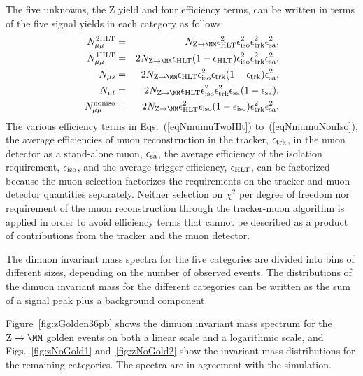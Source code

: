 The five unknowns, the Z yield and four efficiency terms, can be written in terms of
the five signal yields in each category as follows:
\begin{eqnarray}
 \label{eqNmumuTwoHlt}
   \NmumuTwoHlt & = & \NZtomumu \effHlt^2 \effIso^2 \effTrk^2 \effSa^2,  \\
  \label{eqNmumuOneHlt}
   \NmumuOneHlt & = & 2 \NZtomumu \effHlt (1 - \effHlt) \effIso^2 \effTrk^2 \effSa^2,  \\
  \label{eqNmus}
   \Nmus & = & 2 \NZtomumu \effHlt \effIso^2 \effTrk (1 - \effTrk) \effSa^2,  \\
  \label{eqNmut}
   \Nmut & = & 2 \NZtomumu \effHlt \effIso^2 \effTrk^2 \effSa(1 -\effSa), \\
  \label{eqNmumuNonIso}
   \NmumuNonIso & = & 2 \NZtomumu \effHlt^2  \effIso (1 - \effIso)  \effTrk^2 \effSa^2.
\end{eqnarray}
The various efficiency terms in Eqs.~(\ref{eqNmumuTwoHlt}) to~(\ref{eqNmumuNonIso}),
the average efficiencies
of muon reconstruction in the tracker, $\epsilon_\mathrm{trk}$, in the muon detector as
a stand-alone muon, $\epsilon_\mathrm{sa}$, the average efficiency of the isolation requirement,
$\epsilon_\mathrm{iso}$, and the average trigger efficiency, $\epsilon_\mathrm{HLT}$,
can be factorized because the muon selection
factorizes the requirements on the tracker and muon detector quantities separately.
Neither selection on $\chi^2$ per degree of freedom nor requirement of the muon reconstruction through the
tracker-muon algorithm is applied in order to
avoid efficiency terms that cannot be described as a product of contributions from the tracker and
the muon detector.

The dimuon invariant mass spectra for the five categories are divided into
bins of different sizes, depending on the number of observed events.
The distributions of the dimuon invariant mass for the different categories can be written
as the sum of a signal peak plus a background component.


Figure~\ref{fig:zGolden36pb} shows the dimuon invariant mass spectrum for the $\Zmm$ golden events
on both a linear scale and a logarithmic scale, and Figs.~\ref{fig:zNoGold1}
and~\ref{fig:zNoGold2} show the
invariant mass distributions for the remaining categories.
The spectra are in agreement with the simulation.

